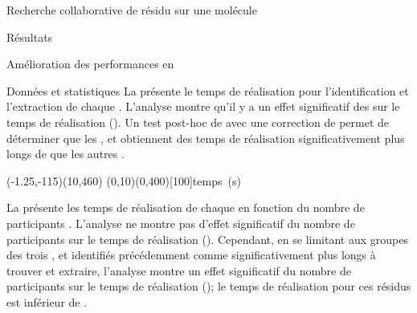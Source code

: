 \documentclass[myfrancais,ngerman,english,french]{mythesis}
\begin{document}
\begin{mychapter}{Recherche collaborative de résidu sur une molécule}
\begin{mysection}{Résultats}
\begin{mysubsection}{Amélioration des performances en }
\begin{mysubsubsection}{Données et statistiques}
					La  présente le temps de réalisation  pour l'identification et l'extraction de chaque  .
					L'analyse montre qu'il y a un effet significatif des   sur le temps de réalisation  ().
					Un test post-hoc de  avec une correction de  permet de déterminer que les  ,  et  obtiennent des temps de réalisation significativement plus longs de  que les autres .

					\begin{myfigure}
						\begin{myps}(-1.25,-115)(10,460)
							\myaxes(0,10){}(0,400)[100]{temps~(s)}
						\end{myps}
					\end{myfigure}

					La  présente les temps de réalisation  de chaque   en fonction du nombre de participants .
					L'analyse ne montre pas d'effet significatif du nombre de participants  sur le temps de réalisation  ().
					Cependant, en se limitant aux groupes des trois  ,  et  identifiés précédemment comme significativement plus longs à trouver et extraire, l'analyse montre un effet significatif du nombre de participants  sur le temps de réalisation  (); le temps de réalisation pour ces résidus est inférieur de .


\end{mysubsubsection}
\end{mysubsection}
\end{mysection}
\end{mychapter}
\end{document}
